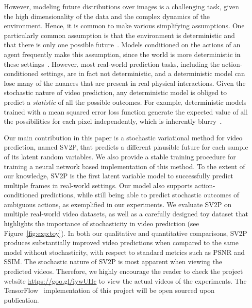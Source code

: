 \documentclass{article} \usepackage{iclr2018_conference,times}
\begin{document}
However, modeling future distributions over images is a challenging task, given the high dimensionality of the data and the complex dynamics of the environment. Hence, it is common to make various simplifying assumptions. One particularly common assumption is that the environment is deterministic and that there is only one possible future~\citep{chiappa2017recurrent, srivastava2015unsupervised, boots2014learning, prednet}.
Models conditioned on the actions of an agent frequently make this assumption, since the world is more deterministic in these settings~\citep{oh2015action,finn2016unsupervised}.
However, most real-world prediction tasks, including the action-conditioned settings, are in fact not deterministic, and a deterministic model can lose many of the nuances that are present in real physical interactions. Given the stochastic nature of video prediction, any deterministic model is obliged to predict a \emph{statistic} of all the possible outcomes. For example, deterministic models trained with a mean squared error loss function generate the expected value of all the possibilities for each pixel independently, which is inherently blurry~\citep{mathieu2015deep}.




Our main contribution in this paper is a stochastic variational method for video prediction, named SV2P, that predicts a different plausible future for each sample of its latent random variables. We also provide a stable training procedure for training a neural network based implementation of this method. To the extent of our knowledge, SV2P is the first latent variable model to successfully predict multiple frames in real-world settings. Our model also supports action-conditioned predictions, while still being able to predict stochastic outcomes of ambiguous actions, as exemplified in our experiments.
We evaluate SV2P on multiple real-world video datasets, as well as a carefully designed toy dataset that highlights the importance of stochasticity in video prediction (see Figure~\ref{fig:exp:toy}). In both our qualitative and quantitative comparisons, SV2P produces substantially improved video predictions when compared to the same model without stochasticity, with respect to standard metrics such as PSNR and SSIM. The stochastic nature of SV2P is most apparent when viewing the predicted videos. Therefore, we highly encourage the reader to check the project website \url{https://goo.gl/iywUHc} to view the actual videos of the experiments. The TensorFlow~\citep{abadi2016tensorflow} implementation of this project will be open sourced upon publication.
\end{document}
